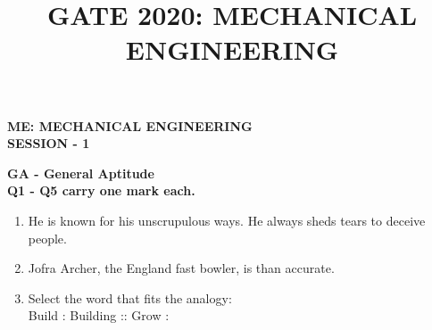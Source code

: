 \documentclass[12pt,onecolumn]{article}
\title{GATE 2020: MECHANICAL ENGINEERING}
\begin{document}
\begin{center}
    \LARGE\textbf{ME: MECHANICAL ENGINEERING}\\
    \Large\textbf{SESSION - 1}
\end{center}

\noindent\large\textbf{GA - General Aptitude}\\
\normalsize\textbf{Q1 - Q5 carry one mark each.}

\begin{enumerate}
    \item He is known for his unscrupulous ways. He always sheds \underline{\hspace{2cm}} tears to deceive people.
          \begin{enumerate}
          \end{enumerate}

    \item Jofra Archer, the England fast bowler, is \underline{\hspace{2cm}} than accurate.
          \begin{enumerate}
          \end{enumerate}

    \item Select the word that fits the analogy:\\Build : Building :: Grow : \underline{\hspace{2cm}}
          \begin{enumerate}
          \end{enumerate}


\end{enumerate}
\end{document}
